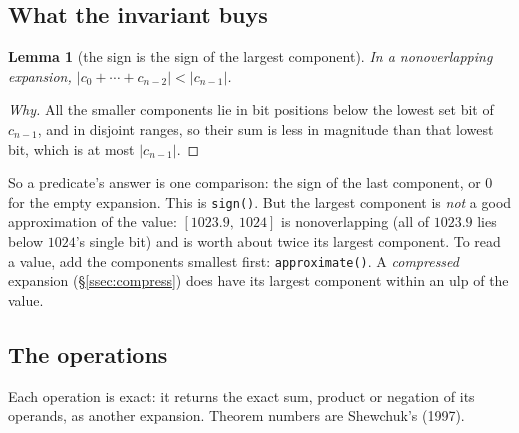 \documentclass[11pt,a4paper]{article}
\newcommand{\code}[1]{\texttt{#1}}
\newcommand{\secref}[1]{\S\ref{#1}}
\newtheorem{lemma}{Lemma}
\theoremstyle{definition}
\theoremstyle{remark}
\begin{document}
\subsection{What the invariant buys}

\begin{lemma}[the sign is the sign of the largest component]\label{lem:sign}
In a nonoverlapping expansion, $|c_0 + \cdots + c_{n-2}| < |c_{n-1}|$.
\end{lemma}
\begin{proof}[Why]
All the smaller components lie in bit positions below the lowest set bit of $c_{n-1}$, and
in disjoint ranges, so their sum is less in magnitude than that lowest bit, which is at most
$|c_{n-1}|$.
\end{proof}

So a predicate's answer is one comparison: the sign of the last component, or 0 for the empty
expansion. This is \code{sign()}. But the largest component is \emph{not} a good approximation of
the value: $[1023.9,\ 1024]$ is nonoverlapping (all of $1023.9$ lies below $1024$'s single bit)
and is worth about twice its largest component. To read a value, add the components smallest
first: \code{approximate()}. A \emph{compressed} expansion (\secref{ssec:compress}) does have its
largest component within an ulp of the value.

\subsection{The operations}

Each operation is exact: it returns the exact sum, product or negation of its operands, as
another expansion. Theorem numbers are Shewchuk's (1997).
\end{document}

